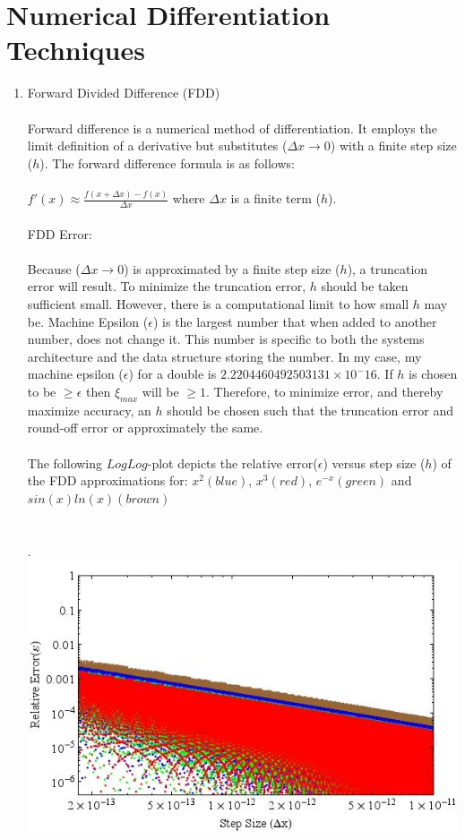 \documentclass{report}
\begin{document}
\begin{enumerate}
\end{enumerate}


\section{Numerical Differentiation Techniques}
\begin{enumerate}
\item Forward Divided Difference (FDD)
\\
\\
Forward difference is a numerical method of differentiation. It employs the limit definition of a derivative but substitutes ($\Delta x \rightarrow 0$) with a finite step size ($h$). The forward difference formula is as follows:
\\
\\
$\displaystyle f'(x) \approx \frac{f(x+\Delta x)-f(x)}{\Delta x}$ where $\Delta x$ is a finite term ($h$).
\\
\\
FDD Error:
\\
\\Because ($\Delta x \rightarrow 0$) is approximated by a finite step size ($h$), a truncation error will result. To minimize the truncation error, $h$ should be taken sufficient small. However, there is a computational limit to how small $h$ may be. Machine Epsilon ($\epsilon$) is the largest number that when added to another number, does not change it. This number is specific to both the systems architecture and the data structure storing the number. In my case, my machine epsilon ($\epsilon$) for a double is $2.2204460492503131\times10^-16$. If $h$ is chosen to be $\geq \epsilon$ then $\xi_{max}$ will be $\geq 1$. Therefore, to minimize error, and thereby maximize accuracy, an $h$ should be chosen such that the truncation error and round-off error or approximately the same.
\\
\\The following $LogLog$-plot depicts the relative error($\epsilon$) versus step size ($h$) of the FDD approximations for: $x^2(blue)$, $x^3(red)$, $e^{-x}(green)$ and $sin(x)ln(x)(brown)$
\\
\\
\\.\hspace{6 mm} \includegraphics[scale=.5]{forwardDiff.jpeg}

\end{enumerate}
\end{document}
